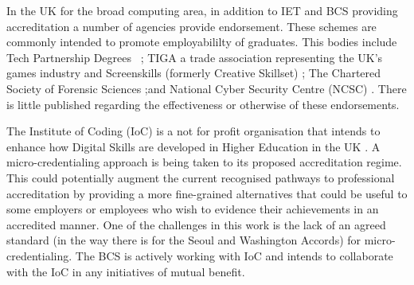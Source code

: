 \documentclass[sigconf]{acmart}
\begin{document}
In the UK for the broad computing area, in addition to IET and BCS providing accreditation a number of agencies provide endorsement. These schemes are commonly intended to promote employabililty of graduates. This bodies include Tech Partnership Degrees ~\cite{TP2019}; TIGA a trade association representing the UK's games industry and  Screenskills (formerly Creative Skillset) \cite{Screenskills2019} ; The Chartered Society of Forensic Sciences \cite{CSOFS2019} ;and National Cyber Security Centre (NCSC) \cite{NCSC2018a}. There is little published regarding the effectiveness or otherwise of these endorsements.

\begin{comment}

In addition, IET and BCS, accreditation in the broad computing area in the UK is also being performed by a few different agencies. A number of bodies are providing endorsements intended to promote employability. Tech Partnership Degrees provides endorsements to Higher Education programmes with specific curricula elements aimed at job market requirements \cite{TP2019}. Tech Partnership Degrees have a specialist scope, endorsing programmes in the area of IT Management for Business and Software Engineering for Business. For games related degrees, TIGA a trade association representing the UK's games industry and  Screenskills (formerly Creative Skillset) \cite{Screenskills2019} operate a similar role. For digital forensics The Chartered Society of Forensic Sciences \cite{CSOFS2019} provides industry related endorsements.  National Cyber Security Centre (NCSC) is a UK Government organisation tasked with enhancing the cybersecurity of the UK and acredits programmes with significant cybersecurity content \cite{NCSC2018a}. There is little published regarding the effectiveness or otherwise of these endorsements.

\end{comment}

The Institute of Coding (IoC) is a not for profit organisation that intends to enhance how Digital Skills are developed in Higher Education in the UK \cite{Davenportetal2019a}. A micro-credentialing approach is being taken to its proposed accreditation regime. This could potentially augment the current recognised pathways to professional accreditation by providing a more fine-grained alternatives that could be useful to some employers or employees who wish to evidence their achievements in an accredited manner.  One of the challenges in this work is the lack of an agreed standard (in the way there is for the Seoul and Washington Accords) for micro-credentialing. The BCS is actively working with IoC and intends to collaborate with the IoC in any initiatives of mutual benefit.
\end{document}
